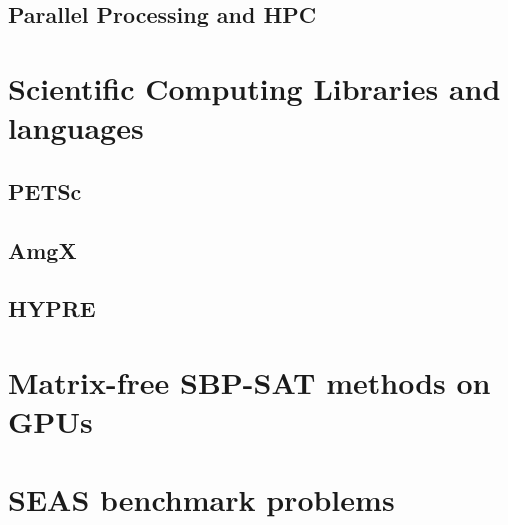 \section{Parallel Processing and HPC}



\chapter{Scientific Computing Libraries and languages}
\section{PETSc}

\section{AmgX}

\section{HYPRE}





\chapter{Matrix-free SBP-SAT methods on GPUs}



\chapter{SEAS benchmark problems}




